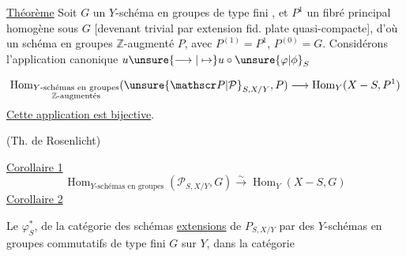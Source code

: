 \noindent\vrule\hspace{.6em}\begin{minipage}{.93\linewidth}
\uline{Théorème} Soit $G$ un $Y$-schéma en groupes  de type fini , et $P^1$ un fibré principal homogène sous $G$ [devenant trivial par extension fid. plate quasi-compacte{\unsure{---}}], d’où un schéma en groupes $\mathbb Z$-augmenté $P$, avec $P^{(1)}=P^1$, $P^{(0)}=G$. Considérons l’application canonique $u{\unsure{\longrightarrow|\mapsto}}u\circ{\unsure{\varphi|\phi}}_S$
\end{minipage}\par
\[
\operatorname{Hom}_{\substack{Y\text{-schémas en groupes}\\\mathbb Z\text{-augmentés}}}
({\unsure{\mathscr P|\mathcal P}}_{S,X/Y},P)\longrightarrow\operatorname{Hom}_Y(X-S,P^1)
\]
\uline{Cette application est bijective}.

(Th. de Rosenlicht)

\uline{Corollaire 1}
\[
\operatorname{Hom}_{Y\text{-schémas en groupes}}(\mathscr P_{S,X/Y},G)\xrightarrow{\sim}\operatorname{Hom}_Y(X-S,G)
\]
\uline{Corollaire 2}
\noindent\vrule\hspace{.6em}\begin{minipage}{.93\linewidth}
 Le   $\varphi_S^*$, de la catégorie des schémas \uline{extensions}  de $P_{S,X/Y}$ par des $Y$-schémas en groupes commutatifs de type fini $G$ sur $Y$, dans la catégorie 
\end{minipage}\par

